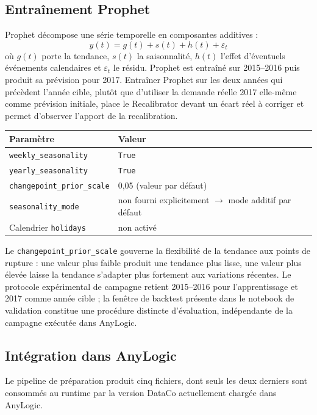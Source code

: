 \documentclass[11pt,a4paper]{article}
\newcommand{\code}[1]{\texttt{#1}}
\begin{document}
\subsection{Entraînement Prophet}

Prophet décompose une série temporelle en composantes additives \cite{taylor2018forecasting} :
\[
y(t) = g(t) + s(t) + h(t) + \varepsilon_t
\]
où $g(t)$ porte la tendance, $s(t)$ la saisonnalité, $h(t)$ l'effet d'éventuels événements calendaires et $\varepsilon_t$ le résidu. Prophet est entraîné sur 2015--2016 puis produit sa prévision pour 2017. Entraîner Prophet sur les deux années qui précèdent l'année cible, plutôt que d'utiliser la demande réelle 2017 elle-même comme prévision initiale, place le Recalibrator devant un écart réel à corriger et permet d'observer l'apport de la recalibration.

\begin{center}
\small
\begin{tabular}{ll}
\toprule
Paramètre & Valeur \\
\midrule
\code{weekly\_seasonality} & \code{True} \\
\code{yearly\_seasonality} & \code{True} \\
\code{changepoint\_prior\_scale} & 0,05 (valeur par défaut) \\
\code{seasonality\_mode} & non fourni explicitement $\to$ mode additif par défaut \\
Calendrier \code{holidays} & non activé \\
\bottomrule
\end{tabular}
\end{center}

Le \code{changepoint\_prior\_scale} gouverne la flexibilité de la tendance aux points de rupture : une valeur plus faible produit une tendance plus lisse, une valeur plus élevée laisse la tendance s'adapter plus fortement aux variations récentes. Le protocole expérimental de campagne retient 2015--2016 pour l'apprentissage et 2017 comme année cible ; la fenêtre de backtest présente dans le notebook de validation constitue une procédure distincte d'évaluation, indépendante de la campagne exécutée dans AnyLogic.

\subsection{Intégration dans AnyLogic}

Le pipeline de préparation produit cinq fichiers, dont seuls les deux derniers sont consommés au runtime par la version DataCo actuellement chargée dans AnyLogic.
\end{document}

